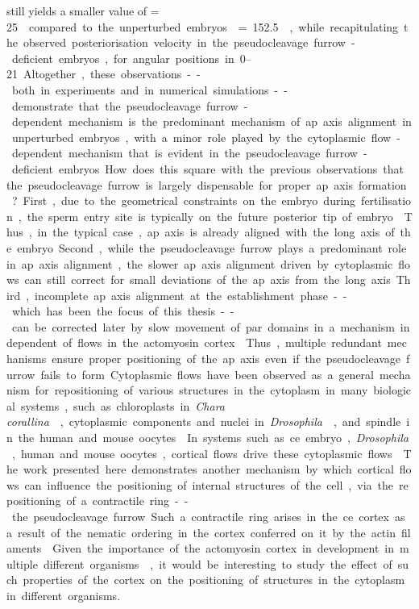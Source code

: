 still yields a smaller value of \nematicLength = \SI{25}{\square\unitLength\per\second} compared to the unperturbed embryos \nematicLength = \SI{152.5}{\square\unitLength\per\second}, while recapitulating the observed posteriorisation velocity in the pseudocleavage furrow-deficient embryos, for angular positions in \SIrange{0}{21}{\unitAngle}. Altogether, these observations -- both in experiments and in numerical simulations -- demonstrate that the pseudocleavage furrow-dependent mechanism is the predominant mechanism of \ac{ap} axis alignment in unperturbed embryos, with a minor role played by the cytoplasmic flow-dependent mechanism that is evident in the pseudocleavage furrow-deficient embryos.

How does this square with the previous observations that the pseudocleavage furrow is largely dispensable for proper \ac{ap} axis formation \citep{rose1995pseudocleavage, cowan2004asymmetric}? First, due to the geometrical constraints on the embryo during fertilisation, the sperm entry site is typically on the future posterior tip of embryo \citep{goldstein1996specification}. Thus, in the typical case, \ac{ap} axis is already aligned with the long axis of the embryo. Second, while the pseudocleavage furrow plays a predominant role in \ac{ap} axis alignment, the slower \ac{ap} axis alignment driven by cytoplasmic flows can still correct for small deviations of the \ac{ap} axis from the long axis. Third, incomplete \ac{ap} axis alignment at the establishment phase -- which has been the focus of this thesis -- can be corrected later by slow movement of \ac{par} domains in a mechanism independent of flows in the actomyosin cortex \citep{mittasch2018non,gessele2020geometric}. Thus, multiple redundant mechanisms ensure proper positioning of the \ac{ap} axis even if the pseudocleavage furrow fails to form.

Cytoplasmic flows have been observed as a general mechanism for repositioning of various structures in the cytoplasm in many biological systems, such as chloroplasts in \emph{Chara corallina} \citep{goldstein2015physical}, cytoplasmic components and nuclei in \emph{Drosophila} \citep{quinlan2016cytoplasmic,deneke2019self}, and spindle in the human and mouse oocytes \citep{yi2011dynamic,wang2020symmetry}. In systems such as \ac{ce} embryo, \emph{Drosophila}, human and mouse oocytes, cortical flows drive these cytoplasmic flows \citep{niwayama2011hydrodynamic,yi2011dynamic,deneke2019self,wang2020symmetry}. The work presented here demonstrates another mechanism by which cortical flows can influence the positioning of internal structures of the cell, via the repositioning of a contractile ring -- the pseudocleavage furrow. Such a contractile ring arises in the \ac{ce} cortex as a result of the nematic ordering in the cortex conferred on it by the actin filaments \citep{reymann2016cortical}. Given the importance of the actomyosin cortex in development in multiple different organisms \citep{gross2017active}, it would be interesting to study the effect of such properties of the cortex on the positioning of structures in the cytoplasm in different organisms.

